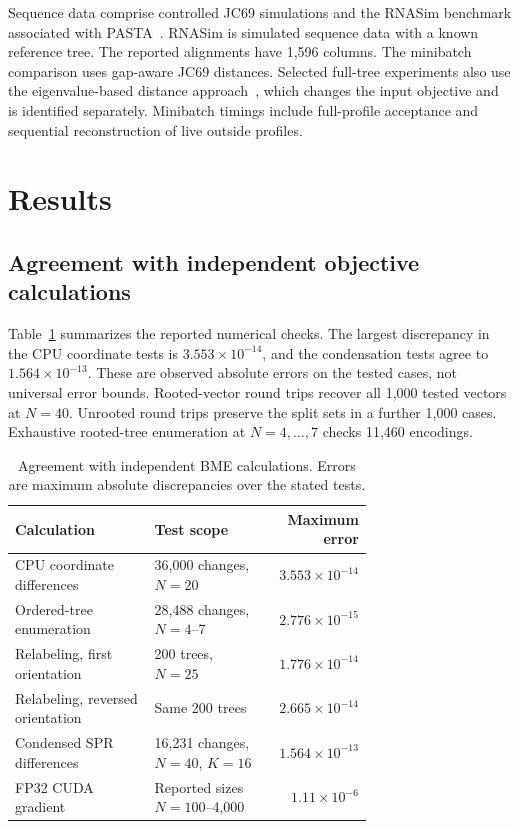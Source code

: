 \documentclass[11pt,a4paper]{article}
\makeatletter
\DeclareRobustCommand{\_}{\ifmmode\nfss@text{\textunderscore}\else\textunderscore\allowbreak\fi}
\theoremstyle{definition}
\makeatother
\begin{document}
Sequence data comprise controlled JC69 simulations and the RNASim benchmark associated with PASTA~\cite{mirarab2015pasta}.
RNASim is simulated sequence data with a known reference tree.
The reported alignments have 1,596 columns.
The minibatch comparison uses gap-aware JC69 distances.
Selected full-tree experiments also use the eigenvalue-based distance approach~\cite{penn2025eigen}, which changes the input objective and is identified separately.
Minibatch timings include full-profile acceptance and sequential reconstruction of live outside profiles.

\section{Results}
\label{sec:results}

\subsection{Agreement with independent objective calculations}

Table~\ref{tab:validation} summarizes the reported numerical checks.
The largest discrepancy in the CPU coordinate tests is $3.553\times10^{-14}$, and the condensation tests agree to $1.564\times10^{-13}$.
These are observed absolute errors on the tested cases, not universal error bounds.
Rooted-vector round trips recover all 1,000 tested vectors at $N=40$.
Unrooted round trips preserve the split sets in a further 1,000 cases.
Exhaustive rooted-tree enumeration at $N=4,\ldots,7$ checks 11,460 encodings.

\begin{table}[tb]
\centering
\caption{Agreement with independent BME calculations. Errors are maximum absolute discrepancies over the stated tests.}
\label{tab:validation}
\small
\begin{tabular}{@{}p{0.39\linewidth}p{0.32\linewidth}r@{}}
\toprule
Calculation & Test scope & Maximum error\\
\midrule
CPU coordinate differences & 36,000 changes, $N=20$ & $3.553\times10^{-14}$\\
Ordered-tree enumeration & 28,488 changes, $N=4$--7 & $2.776\times10^{-15}$\\
Relabeling, first orientation & 200 trees, $N=25$ & $1.776\times10^{-14}$\\
Relabeling, reversed orientation & Same 200 trees & $2.665\times10^{-14}$\\
Condensed SPR differences & 16,231 changes, $N=40$, $K=16$ & $1.564\times10^{-13}$\\
FP32 CUDA gradient & Reported sizes $N=100$--4,000 & $1.11\times10^{-6}$\\
\bottomrule
\end{tabular}
\end{table}
\end{document}
